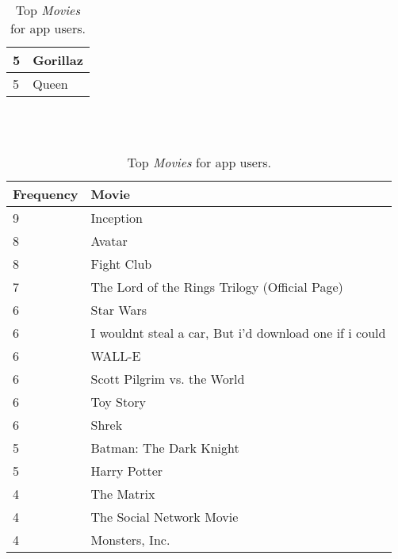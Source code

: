 \begin{table}[h]
\begin{minipage}[b]{.50\textwidth}
\begin{tabular}{|l|l|}
		5 & Gorillaz \\ \hline
		5 & Queen \\ \hline
  \end{tabular}
  \caption{Top \emph{Music} for app users.}
\end{minipage}
\\
\\
\begin{minipage}[b]{1.0\textwidth}
\centering
  \begin{tabular}{|l|l|} %
  \hline
  		\textbf{Frequency} & \textbf{Movie} \\ \hline
  		9 & Inception \\ \hline
		8 & Avatar \\ \hline
		8 & Fight Club \\ \hline
		7 & The Lord of the Rings Trilogy (Official Page) \\ \hline
		6 & Star Wars \\ \hline
		6 & I wouldnt steal a car, But i'd download one if i could \\ \hline
		6 & WALL-E \\ \hline
		6 & Scott Pilgrim vs. the World \\ \hline
		6 & Toy Story \\ \hline
		6 & Shrek \\ \hline
		5 & Batman: The Dark Knight \\ \hline
		5 & Harry Potter \\ \hline
		4 & The Matrix \\ \hline
		4 & The Social Network Movie \\ \hline
		4 & Monsters, Inc. \\ \hline
  \end{tabular}
  \caption{Top \emph{Movies} for app users.}
\end{minipage}
\end{table}
